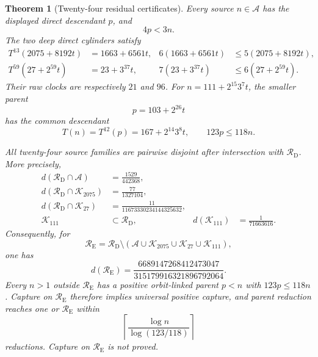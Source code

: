 \documentclass[11pt,letterpaper]{article}
\newtheorem{theorem}{Theorem}
\begin{document}
\begin{theorem}[Twenty-four residual certificates]\label{thm:FurtherCertificates}
Every source \(n\in\mathcal A\) has the displayed direct descendant \(p\),
and
\[
4p<3n.
\]
The two deep direct cylinders satisfy
\[
\begin{aligned}
T^{13}(2075+8192t)&=1663+6561t,&6(1663+6561t)&\le5(2075+8192t),\\
T^{59}(27+2^{59}t)&=23+3^{37}t,&7(23+3^{37}t)&\le6(27+2^{59}t).
\end{aligned}
\]
Their raw clocks are respectively \(21\) and \(96\).
For \(n=111+2^{15}3^7t\), the smaller parent
\[
p=103+2^{26}t
\]
has the common descendant
\[
T(n)=T^{12}(p)=167+2^{14}3^8t,
\qquad 123p\le118n.
\]

All twenty-four source families are pairwise disjoint after intersection
with \(\mathcal R_{\mathrm D}\). More precisely,
\[
\begin{aligned}
d(\mathcal R_{\mathrm D}\cap\mathcal A)&=\frac{1529}{442368},\\
d(\mathcal R_{\mathrm D}\cap\mathcal K_{2075})&=\frac{77}{1327104},\\
d(\mathcal R_{\mathrm D}\cap\mathcal K_{27})
 &=\frac{11}{11673330234144325632},\\
\mathcal K_{111}&\subset\mathcal R_{\mathrm D},
&d(\mathcal K_{111})&=\frac1{71663616}.
\end{aligned}
\]
Consequently, for
\[
\mathcal R_{\mathrm E}=\mathcal R_{\mathrm D}\setminus
 (\mathcal A\cup\mathcal K_{2075}\cup\mathcal K_{27}
  \cup\mathcal K_{111}),
\]
one has
\[
d(\mathcal R_{\mathrm E})
 =\frac{6689147268412473047}{315179916321896792064}.
\]
Every \(n>1\) outside \(\mathcal R_{\mathrm E}\) has a positive
orbit-linked parent \(p<n\) with \(123p\le118n\). Capture on
\(\mathcal R_{\mathrm E}\) therefore implies universal positive capture,
and parent reduction reaches one or \(\mathcal R_{\mathrm E}\) within
\[
\left\lceil\frac{\log n}{\log(123/118)}\right\rceil
\]
reductions. Capture on \(\mathcal R_{\mathrm E}\) is not proved.
\end{theorem}
\end{document}
